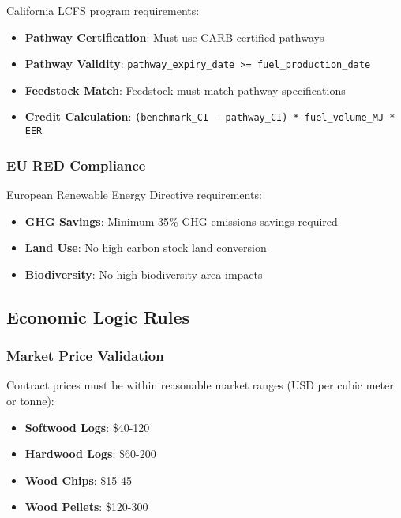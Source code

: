 California LCFS program requirements:

\begin{itemize}
    \item \textbf{Pathway Certification}: Must use CARB-certified pathways
    \item \textbf{Pathway Validity}: \texttt{pathway\_expiry\_date >= fuel\_production\_date}
    \item \textbf{Feedstock Match}: Feedstock must match pathway specifications
    \item \textbf{Credit Calculation}: \texttt{(benchmark\_CI - pathway\_CI) * fuel\_volume\_MJ * EER}
\end{itemize}

\subsubsection{EU RED Compliance}

European Renewable Energy Directive requirements:

\begin{itemize}
    \item \textbf{GHG Savings}: Minimum 35\% GHG emissions savings required
    \item \textbf{Land Use}: No high carbon stock land conversion
    \item \textbf{Biodiversity}: No high biodiversity area impacts
\end{itemize}

\subsection{Economic Logic Rules}
\label{sec:economic-logic}

\subsubsection{Market Price Validation}

Contract prices must be within reasonable market ranges (USD per cubic meter or tonne):

\begin{itemize}
    \item \textbf{Softwood Logs}: \$40-120
    \item \textbf{Hardwood Logs}: \$60-200
    \item \textbf{Wood Chips}: \$15-45
    \item \textbf{Wood Pellets}: \$120-300
\end{itemize}

